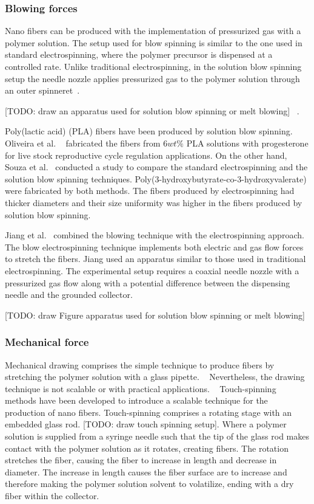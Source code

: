 \documentclass[5p,,preprint,12pt,twocolumn]{elsarticle}
\begin{document}
\subsubsection{Blowing forces}Nano fibers can be produced with the implementation of pressurized gas with a polymer solution. The setup used for blow spinning is similar to the one used in standard electrospinning, where the polymer precursor is dispensed at a controlled rate. Unlike traditional electrospinning, in the solution blow spinning setup the needle nozzle applies pressurized gas to the polymer solution through an outer spinneret\unskip~\cite{527120:13538056}. 

[TODO: draw an apparatus used for solution blow spinning or melt blowing] \unskip~\cite{527120:13538056}.

Poly(lactic acid) (PLA) fibers have been produced by solution blow spinning. Oliveira et al. \unskip~\cite{527120:13539278} fabricated the fibers from $6 wt\% $ PLA solutions with progesterone for live stock reproductive cycle regulation applications. On the other hand, Souza et al.\unskip~\cite{527120:13538056} conducted a study to compare the standard electrospinning and the solution blow spinning techniques. Poly(3-hydroxybutyrate-co-3-hydroxyvalerate) were fabricated by both methods. The fibers produced by electrospinning had thicker diameters and their size uniformity was higher in the fibers produced by solution blow spinning.

Jiang et al.\unskip~\cite{527120:13554126} combined the blowing technique with the electrospinning approach. The blow electrospinning technique implements both electric and gas flow forces to stretch the fibers. Jiang used an apparatus similar to those used in traditional electrospinning. The experimental setup requires a coaxial needle nozzle with a pressurized gas flow along with a potential difference between the dispensing needle and the grounded collector. 

[TODO: draw Figure apparatus used for solution blow spinning or melt blowing]



\subsubsection{Mechanical force}Mechanical drawing comprises the simple technique to produce fibers by stretching the polymer solution with a glass pipette. \unskip~\cite{527120:14024998} Nevertheless, the drawing technique is not scalable or with practical applications. \unskip~\cite{527120:14025041} Touch-spinning methods have been developed to introduce a scalable technique for the production of nano fibers. Touch-spinning comprises a rotating stage with an embedded glass rod. [TODO: draw touch spinning setup]. Where a polymer solution is supplied from a syringe needle such that the tip of the glass rod makes contact with the polymer solution as it rotates, creating fibers. The rotation stretches the fiber, causing the fiber to increase in length and decrease in diameter. The increase in length causes the fiber surface are to increase and therefore making the polymer solution solvent to volatilize, ending with a dry fiber within the collector.
\end{document}
